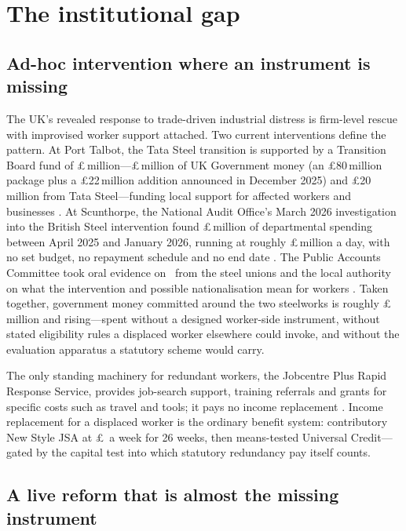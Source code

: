 \section{The institutional gap}\label{sec:institutional}

\subsection{Ad-hoc intervention where an instrument is missing}

The UK's revealed response to trade-driven industrial distress is
firm-level rescue with improvised worker support attached. Two current
interventions define the pattern. At Port Talbot, the Tata Steel
transition is supported by a Transition Board fund of
\pounds\InstPortTalbotTotal\,million---\pounds\InstPortTalbotGov\,million
of UK Government money (an \pounds 80\,million package plus a
\pounds 22\,million addition announced in December 2025) and
\pounds 20\,million from Tata Steel---funding local support for affected
workers and businesses \citep{ukgov2025porttalbot}. At Scunthorpe, the
National Audit Office's March 2026 investigation into the British Steel
intervention found \pounds\InstScunthorpeSpend\,million of departmental
spending between April 2025 and January 2026, running at roughly
\pounds\InstScunthorpeDaily\,million a day, with no set budget, no
repayment schedule and no end date \citep{nao2026}. The Public Accounts
Committee took oral evidence on \InstPACDate\ from the steel unions and
the local authority on what the intervention and possible nationalisation
mean for workers \citep{pac2026}. Taken together, government money
committed around the two steelworks is roughly
\pounds\InstAdHocSteelTotal\,million and rising---spent without a
designed worker-side instrument, without stated eligibility rules a
displaced worker elsewhere could invoke, and without the evaluation
apparatus a statutory scheme would carry.

The only standing machinery for redundant workers, the Jobcentre Plus
Rapid Response Service, provides job-search support, training referrals
and grants for specific costs such as travel and tools; it pays no income
replacement \citep{dwprrs}. Income replacement for a displaced worker is
the ordinary benefit system: contributory New Style JSA at
\pounds\TaaJsaWeekly\ a week for 26 weeks, then means-tested
Universal Credit---gated by the capital test into which statutory
redundancy pay itself counts.

\subsection{A live reform that is almost the missing instrument}

